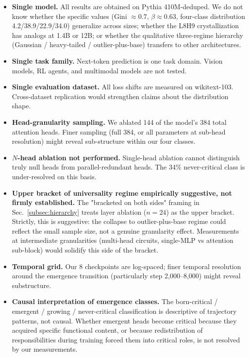 \documentclass{article}
\begin{document}
\begin{itemize}
    \item \textbf{Single model.} All results are obtained on Pythia 410M-deduped. We do not know whether the specific values (Gini $\approx 0.7$, $\beta \approx 0.63$, four-class distribution 4.2/38.9/22.9/34.0) generalize across sizes; whether the L8H9 crystallization has analogs at 1.4B or 12B; or whether the qualitative three-regime hierarchy (Gaussian / heavy-tailed / outlier-plus-base) transfers to other architectures.
    \item \textbf{Single task family.} Next-token prediction is one task domain. Vision models, RL agents, and multimodal models are not tested.
    \item \textbf{Single evaluation dataset.} All loss shifts are measured on wikitext-103. Cross-dataset replication would strengthen claims about the distribution shape.
    \item \textbf{Head-granularity sampling.} We ablated 144 of the model's 384 total attention heads. Finer sampling (full 384, or all parameters at sub-head resolution) might reveal sub-structure within our four classes.
    \item \textbf{$N$-head ablation not performed.} Single-head ablation cannot distinguish truly null heads from parallel-redundant heads. The 34\% never-critical class is under-resolved on this basis.
    \item \textbf{Upper bracket of universality regime empirically suggestive, not firmly established.} The "bracketed on both sides" framing in Sec.~\ref{subsec:hierarchy} treats layer ablation ($n = 24$) as the upper bracket. Strictly, this is suggestive: the collapse to outlier-plus-base regime could reflect the small sample size, not a genuine granularity effect. Measurements at intermediate granularities (multi-head circuits, single-MLP vs attention sub-block) would solidify this side of the bracket.
    \item \textbf{Temporal grid.} Our 8 checkpoints are log-spaced; finer temporal resolution around the emergence transition (particularly step 2,000--8,000) might reveal substructure.
    \item \textbf{Causal interpretation of emergence classes.} The born-critical / emergent / growing / never-critical classification is descriptive of trajectory patterns, not causal. Whether emergent heads become critical because they acquired specific functional content, or because redistribution of responsibilities during training forced them into critical roles, is not resolved by our measurements.

\end{itemize}
\end{document}
